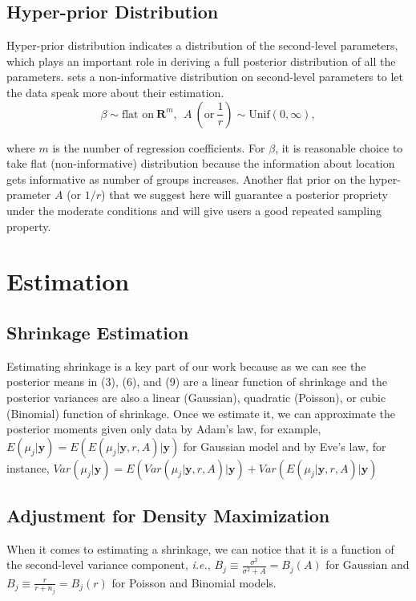 \documentclass[article]{jss}
\begin{document}
\subsection[Hyper-prior Distribution]{Hyper-prior Distribution}
Hyper-prior distribution indicates a distribution of the second-level parameters, which plays an important role in deriving a full posterior distribution of all the parameters.  sets a non-informative distribution on second-level parameters to let the data speak more about their estimation.
\begin{equation}
\beta \sim \textrm{flat on}~ \mathbf{R}^{m},~~A ~(\textrm{or}~ \frac{1}{r})\sim \textrm{Unif}(0, \infty),
\end{equation}

where $m$ is the number of regression coefficients. For $\beta$, it is reasonable choice to take flat (non-informative) distribution because the information about location gets informative as number of groups increases. Another flat prior on the hyper-prameter $A$ (or $1/r$) that we suggest here will guarantee a posterior propriety under the moderate conditions and will give users a good repeated sampling property.
\\



\section[Estimation]{Estimation}
\subsection[Shrinkage Estimation]{Shrinkage Estimation}
Estimating shrinkage is a key part of our work because as we can see the posterior means in (3), (6), and (9) are a linear function of shrinkage and the posterior variances are also a linear (Gaussian), quadratic (Poisson), or cubic (Binomial) function of shrinkage. Once we estimate it, we can approximate the posterior moments given only data by Adam's law, for example, $E(\mu_{j}\vert \textbf{y})=E(E(\mu_{j}\vert \textbf{y}, r, A)\vert \textbf{y})$ for Gaussian model and by Eve's law, for instance, $Var(\mu_{j}\vert \textbf{y})=E(Var(\mu_{j}\vert \textbf{y}, r, A)\vert \textbf{y})+Var(E(\mu_{j}\vert \textbf{y}, r, A)\vert \textbf{y})$
\subsection[ADM]{Adjustment for Density Maximization}
When it comes to estimating a shrinkage, we can notice that it is a function of the second-level variance component, \emph{i.e.}, $B_{j}\equiv\frac{\sigma^{2}}{\sigma^{2}+A}=B_{j}(A)$ for Gaussian and $B_{j}\equiv\frac{r}{r+n_{j}}=B_{j}(r)$ for Poisson and Binomial models.
\\
\end{document}

